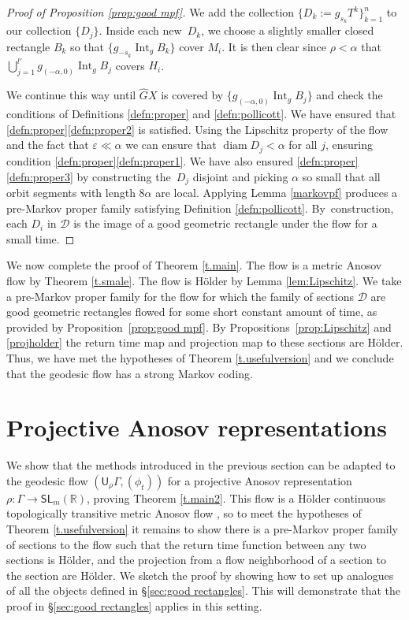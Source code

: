 \documentclass[JEP,XML,SOM,Unicode,NoFloatCountersInSection]{cedram}
\let\mathcal\mathscr
\let\epsilon\varepsilon
\theoremstyle{definition}
\numberwithin{equation}{section}
\DeclareMathOperator{\diam}{diam}
\DeclareMathOperator{\Int}{Int}
\newcommand\DDD{\mathcal D}
\begin{document}
\begin{proof}[Proof of Proposition \ref{prop:good mpf}]
We add the collection $\{ D_k\!:=\!g_{s_k}T^k \}_{k=1}^n$ to our collection $\{D_j\}$. Inside each new~$D_k$, we choose a slightly smaller closed rectangle $B_k$ so that $\{ g_{-s_k} \Int_g B_k \}$ cover $M_i$. It is then clear since $\rho<\alpha$ that $\bigcup_{j=1}^{l'} g_{(-\alpha,0)} \Int_g B_j$ covers $H_i$.

We continue this way until $\hat GX$ is covered by $\{ g_{(-\alpha,0)} \Int_g B_j \}$ and check the conditions of Definitions \ref{defn:proper} and \ref{defn:pollicott}. We have ensured that \ref{defn:proper}\eqref{defn:proper2} is satisfied. Using the Lipschitz property of the flow and the fact that $\epsilon \ll  \alpha$ we can ensure that $\diam D_j < \alpha$ for all $j$, ensuring condition \ref{defn:proper}\eqref{defn:proper1}. We have also ensured \ref{defn:proper}\eqref{defn:proper3} by constructing the~$D_j$ disjoint and picking $\alpha$ so small that all orbit segments with length $8\alpha$ are local. \hbox{Applying} Lemma \ref{markovpf} produces a pre-Markov proper family satisfying Definition \ref{defn:pollicott}. By~construction, each $D_i$ in $\mathcal{D}$ is the image of a good geometric rectangle under the flow for a small time.
\end{proof}

We now complete the proof of Theorem \ref{t.main}. The flow is a metric Anosov flow by Theorem \ref{t.smale}. The flow is Hölder by Lemma \ref{lem:Lipschitz}. We take a pre-Markov proper family for the flow for which the family of sections $\DDD$ are good geometric rectangles flowed for some short constant amount of time, as provided by Proposition~\ref{prop:good mpf}. By Propositions~\ref{prop:Lipschitz} and \ref{projholder} the return time map and projection map to these sections are Hölder. Thus, we have met the hypotheses of Theorem \ref{t.usefulversion} and we conclude that the geodesic flow has a strong Markov coding.

\section{Projective Anosov representations} \label{sec:twoexamples}

We show that the methods introduced in the previous section can be adapted to the geodesic flow $(\mathsf{U}_\rho\Gamma, (\phi_t))$ for a projective Anosov representation $\rho: \Gamma \to \mathsf{SL}_m(\mathbb{R})$, proving Theorem \ref{t.main2}. This flow is a Hölder continuous topologically transitive metric Anosov flow \cite[Prop.\,5.1]{bcls}, so to meet the hypotheses of Theorem \ref{t.usefulversion} it remains to show there is a pre-Markov proper family of sections to the flow such that the return time function between any two sections is Hölder, and the projection from a flow neighborhood of a section to the section are Hölder. We sketch the proof by showing how to set up analogues of all the objects defined in \S \ref{sec:good rectangles}. This will demonstrate that the proof in \S \ref{sec:good rectangles} applies in this setting.
\end{document}
